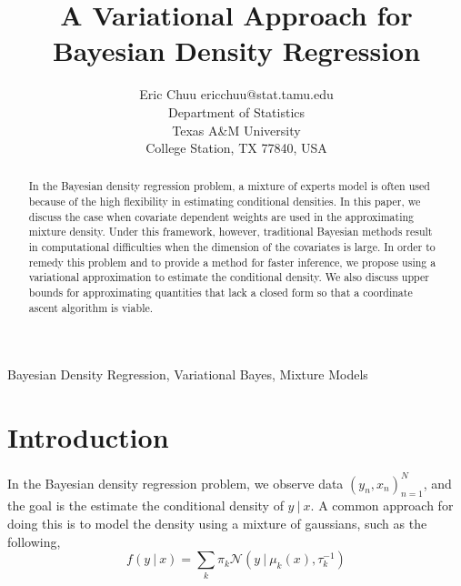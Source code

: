 \documentclass[twoside,11pt]{article}
\newcommand\given[1][]{\:#1\vert\:}
\begin{document}
\title{A Variational Approach for Bayesian Density Regression}

\author{\name Eric Chuu \email ericchuu@stat.tamu.edu \\
       \addr Department of Statistics\\
       Texas A\&M University \\
       College Station, TX 77840, USA}

\maketitle

\begin{abstract}%
In the Bayesian density regression problem, a mixture of experts model is often used because of the high flexibility in estimating conditional densities. In this paper, we discuss the case when covariate dependent weights are used in the approximating mixture density. Under this framework, however, traditional Bayesian methods result in computational difficulties when the dimension of the covariates is large. In order to remedy this problem and to provide a method for faster inference, we propose using a variational approximation to estimate the conditional density. We also discuss upper bounds for approximating quantities that lack a closed form so that a coordinate ascent algorithm is viable.
\end{abstract}

\begin{keywords}
  Bayesian Density Regression, Variational Bayes, Mixture Models
\end{keywords}

\section{Introduction}

In the Bayesian density regression problem, we observe data $\left(y_n, x_n \right)_{n=1}^N$, and the goal is the estimate the conditional density of $y \given x$. A common approach for doing this is to model the density using a mixture of gaussians, such as the following,
\begin{equation} \label{eq:general_gm}
	f(y \given x) = \sum_{k} \pi_k \mathcal{N} \left(y \given \mu_k(x), \tau_k^{-1} \right)
\end{equation}
\end{document}
